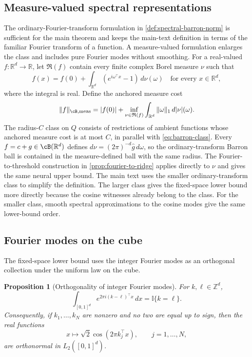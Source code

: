 \documentclass[11pt,twoside]{article}
\newcommand{\I}{\mathbb I}
\newcommand{\R}{\mathbb R}
\newtheorem{proposition}[theorem]{Proposition}
\theoremstyle{definition}
\theoremstyle{remark}
\begin{document}
\subsection{Measure-valued spectral representations}
\label{app:fourier-measure-extension}

The ordinary-Fourier-transform formulation in
\cref{def:spectral-barron-norm} is sufficient for the main theorem and keeps
the main-text definition in terms of the familiar Fourier transform of a
function. A measure-valued formulation enlarges the class and includes pure
Fourier modes without smoothing. For a real-valued
\(f:\R^d\to\R\), let \(\mathfrak R(f)\) contain every finite complex Borel
measure \(\nu\) such that
\begin{equation}
 f(x)=f(0)+\int_{\R^d}(e^{i\omega^\top x}-1)\,d\nu(\omega)
 \quad\text{for every }x\in\R^d,
 \label{eq:barron-measure-representation}
\end{equation}
where the integral is real. Define the anchored measure cost
\begin{equation}
 \|f\|_{\cB,\mathrm{meas}}
 =|f(0)|+\inf_{\nu\in\mathfrak R(f)}
 \int_{\R^d}\|\omega\|_1\,d|\nu|(\omega).
 \label{eq:barron-measure-coefficient}
\end{equation}
The radius-\(C\) class on \(Q\) consists of restrictions of ambient functions
whose anchored measure cost is at most \(C\), in parallel with
\cref{eq:barron-class}. Every \(f=c+g\in\cB(\R^d)\) defines
\(d\nu=(2\pi)^{-d}\widehat g\,d\omega\), so the ordinary-transform Barron ball
is contained in the measure-defined ball with the same radius. The
Fourier-to-threshold construction in \cref{prop:fourier-to-ridge} applies
directly to \(\nu\) and gives the
same neural upper bound. The main text uses the smaller ordinary-transform
class to simplify the definition. The larger class gives the fixed-space lower
bound more directly because the cosine witnesses already belong to the class.
For the smaller class, smooth spectral approximations to the cosine modes give
the same lower-bound order.

\subsection{Fourier modes on the cube}

The fixed-space lower bound uses the integer Fourier modes as an orthogonal
collection under the uniform law on the cube.

\begin{proposition}[Orthogonality of integer Fourier modes]
\label{prop:cube-fourier-orthogonality}
For $k,\ell\in\mathbb Z^d$,
\begin{equation}
 \int_{[0,1]^d}e^{2\pi i(k-\ell)^\top x}\,dx
 =\I\{k=\ell\}.
 \label{eq:cube-complex-fourier-orthogonality}
\end{equation}
Consequently, if $k_1,\ldots,k_N$ are nonzero and no two are equal up to
sign, then the real functions
\begin{equation}
 x\longmapsto\sqrt2\cos(2\pi k_j^\top x),
 \qquad j=1,\ldots,N,
 \label{eq:cube-cosine-orthonormal-family}
\end{equation}
are orthonormal in $L_2([0,1]^d)$.
\end{proposition}
\end{document}
